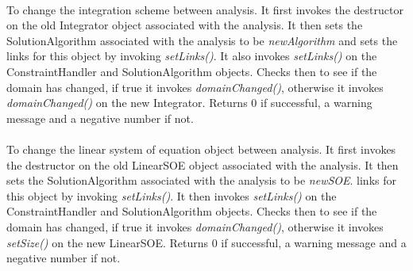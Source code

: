 \\
To change the integration scheme between analysis. It first invokes the
destructor on the old Integrator object associated with the
analysis. It then sets the SolutionAlgorithm 
associated with the analysis to be {\em newAlgorithm} and sets the
links for this object by invoking {\em setLinks()}. It also invokes
{\em setLinks()} on the ConstraintHandler and SolutionAlgorithm
objects. Checks then to see if the domain has changed, if true it
invokes {\em domainChanged()}, otherwise it invokes {\em
domainChanged()} on the new Integrator. Returns $0$ if
successful, a warning message and a negative number if not.\\

\\
To change the linear system of equation object between analysis. It
first invokes the destructor on the old LinearSOE object associated
with the analysis. It then sets the SolutionAlgorithm 
associated with the analysis to be {\em newSOE}.
links for this object by invoking {\em setLinks()}. It then invokes
{\em setLinks()} on the ConstraintHandler and SolutionAlgorithm
objects. Checks then to see if the domain has changed, if true it
invokes {\em domainChanged()}, otherwise it invokes {\em
setSize()} on the new LinearSOE. Returns $0$ if successful, a warning
message and a negative number if not.\\ 


